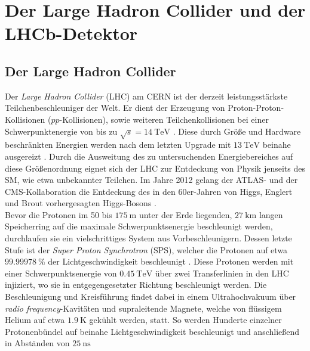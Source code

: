 \chapter{Der Large Hadron Collider und der LHCb-Detektor}
\label{chap:3}
%
\section{Der Large Hadron Collider}
%
Der \textit{Large Hadron Collider} (LHC) \cite{lhc} am CERN ist der derzeit leistungsstärkste Teilchenbeschleuniger der Welt. Er dient der Erzeugung von Proton-Proton-Kollisionen ($pp$-Kollisionen), sowie weiteren Teilchenkollisionen bei einer Schwerpunktenergie von bis zu $\sqrt{s}=\SI{14}{\tera\electronvolt}$ \cite{lhc}. Diese durch Größe und Hardware beschränkten Energien werden nach dem letzten Upgrade mit $\SI{13}{\tera\electronvolt}$ beinahe ausgereizt \cite{lhc}. Durch die Ausweitung des zu untersuchenden Energiebereiches auf diese Größenordnung eignet sich der LHC zur Entdeckung von Physik jenseits des SM, wie etwa unbekannter Teilchen. Im Jahre 2012 gelang der ATLAS- und der CMS-Kollaboration die Entdeckung des in den 60er-Jahren von Higgs, Englert und Brout vorhergesagten Higgs-Bosons \cite{higgs_atlas, higgs_cms}.\\
Bevor die Protonen im 50 bis $\SI{175}{\meter}$ \cite{lhc} unter der Erde liegenden, $\SI{27}{\kilo\meter}$ langen Speicherring auf die maximale Schwerpunktsenergie beschleunigt werden, durchlaufen sie ein vielschrittiges System aus Vorbeschleunigern. Dessen letzte Stufe ist der \textit{Super Proton Synchrotron} (SPS), welcher die Protonen auf etwa $\SI{99,99978}{\percent}$ der Lichtgeschwindigkeit beschleunigt \cite{lhc}. Diese Protonen werden mit einer Schwerpunktsenergie von $\SI{0,45}{\tera\electronvolt}$ über zwei Transferlinien in den LHC injiziert, wo sie in entgegengesetzter Richtung beschleunigt werden. Die Beschleunigung und Kreisführung findet dabei in einem Ultrahochvakuum über \textit{radio frequency}-Kavitäten und supraleitende Magnete, welche von flüssigem Helium auf etwa $\SI{1,9}{\kelvin}$ gekühlt werden, statt. So werden Hunderte einzelner Protonenbündel auf beinahe Lichtgeschwindigkeit beschleunigt und anschließend in Abständen von $\SI{25}{\nano\second}$
